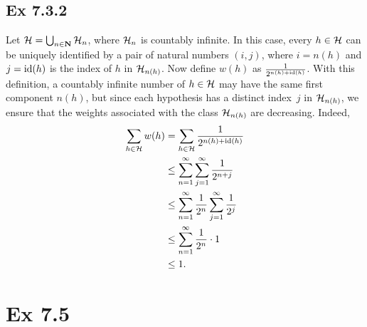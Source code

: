 \subsection*{Ex 7.3.2}

Let $\mathcal{H} = \bigcup_{n \in \mathbf{N}} \mathcal{H}_n$, where $\mathcal{H}_n$ is countably infinite.
In this case, every $h \in \mathcal{H}$ can be uniquely identified by a pair of natural numbers
$(i, j)$, where $i = n(h)$ and $j = \operatorname{id} (h)$ is the index of $h$ in $\mathcal{H}_{ n(h) }$. Now define $w(h)$
as $\frac{1}{2^{n(h) + \operatorname{id}(h)}}$. With this definition, a countably infinite number of $h \in \mathcal{H}$
may have the same first component $n(h)$, but since each hypothesis
has a distinct index~$j$ in $\mathcal{H}_{n(h)}$, we ensure that the weights associated
with the class $\mathcal{H}_{n(h)}$ are decreasing. Indeed,
\begin{align*}
    \sum_{h \in \mathcal{H}} w(h) & = \sum_{h \in \mathcal{H}} \frac{1}{2^{n(h) + \operatorname{id}(h)}} \\
        & \leq \sum_{n = 1}^{\infty} \sum_{j = 1}^{\infty} \frac{1}{2^{n + j}} \\
        & \leq \sum_{n = 1}^{\infty} \frac{1}{2^n} \sum_{j = 1}^{\infty} \frac{1}{2^j} \\
        & \leq \sum_{n = 1}^{\infty} \frac{1}{2^n} \cdot 1 \\
        & \leq 1.
\end{align*}

\section*{Ex 7.5}


